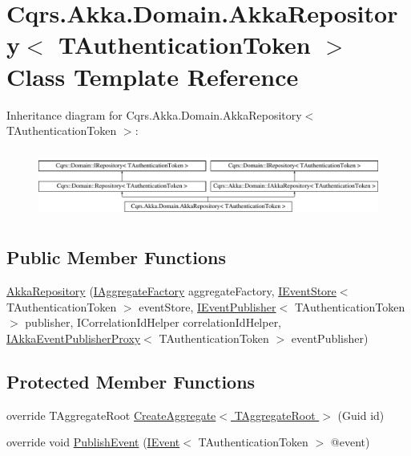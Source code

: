 \hypertarget{classCqrs_1_1Akka_1_1Domain_1_1AkkaRepository}{}\section{Cqrs.\+Akka.\+Domain.\+Akka\+Repository$<$ T\+Authentication\+Token $>$ Class Template Reference}
\label{classCqrs_1_1Akka_1_1Domain_1_1AkkaRepository}
Inheritance diagram for Cqrs.\+Akka.\+Domain.\+Akka\+Repository$<$ T\+Authentication\+Token $>$\+:\begin{figure}[H]
\begin{center}
\leavevmode
\includegraphics[height=2.270270cm]{classCqrs_1_1Akka_1_1Domain_1_1AkkaRepository}
\end{center}
\end{figure}
\subsection*{Public Member Functions}
\begin{DoxyCompactItemize}
\item 
\hyperlink{classCqrs_1_1Akka_1_1Domain_1_1AkkaRepository_a2279bbdecbc33f50b20159aaec0805bf_a2279bbdecbc33f50b20159aaec0805bf}{Akka\+Repository} (\hyperlink{interfaceCqrs_1_1Domain_1_1Factories_1_1IAggregateFactory}{I\+Aggregate\+Factory} aggregate\+Factory, \hyperlink{interfaceCqrs_1_1Events_1_1IEventStore}{I\+Event\+Store}$<$ T\+Authentication\+Token $>$ event\+Store, \hyperlink{interfaceCqrs_1_1Events_1_1IEventPublisher}{I\+Event\+Publisher}$<$ T\+Authentication\+Token $>$ publisher, I\+Correlation\+Id\+Helper correlation\+Id\+Helper, \hyperlink{interfaceCqrs_1_1Akka_1_1Events_1_1IAkkaEventPublisherProxy}{I\+Akka\+Event\+Publisher\+Proxy}$<$ T\+Authentication\+Token $>$ event\+Publisher)
\end{DoxyCompactItemize}
\subsection*{Protected Member Functions}
\begin{DoxyCompactItemize}
\item 
override T\+Aggregate\+Root \hyperlink{classCqrs_1_1Akka_1_1Domain_1_1AkkaRepository_ad8861fdcfc749c9caae4dacf1284aa7d_ad8861fdcfc749c9caae4dacf1284aa7d}{Create\+Aggregate$<$ T\+Aggregate\+Root $>$} (Guid id)
\item 
override void \hyperlink{classCqrs_1_1Akka_1_1Domain_1_1AkkaRepository_ae0ead40945c7600a3f3f38fa302ef35f_ae0ead40945c7600a3f3f38fa302ef35f}{Publish\+Event} (\hyperlink{interfaceCqrs_1_1Events_1_1IEvent}{I\+Event}$<$ T\+Authentication\+Token $>$ @event)
\end{DoxyCompactItemize}
